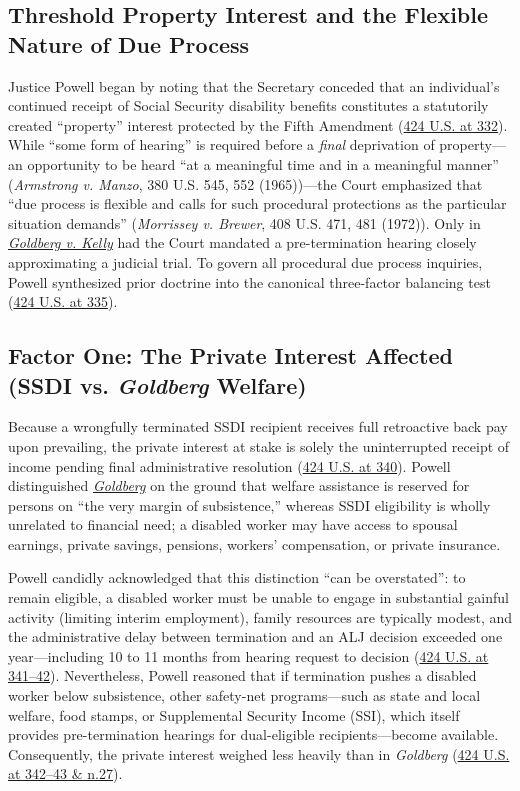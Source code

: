 \documentclass[12pt]{article}
\begin{document}
\subsection{Threshold Property Interest and the Flexible Nature of Due Process}
Justice Powell began by noting that the Secretary conceded that an individual's continued receipt of Social Security disability benefits constitutes a statutorily created ``property'' interest protected by the Fifth Amendment (\href{https://supreme.justia.com/cases/federal/us/424/319/}{424 U.S. at 332}). While ``some form of hearing'' is required before a \emph{final} deprivation of property---an opportunity to be heard ``at a meaningful time and in a meaningful manner'' (\emph{Armstrong v. Manzo}, 380 U.S. 545, 552 (1965))---the Court emphasized that ``due process is flexible and calls for such procedural protections as the particular situation demands'' (\emph{Morrissey v. Brewer}, 408 U.S. 471, 481 (1972)). Only in \href{https://supreme.justia.com/cases/federal/us/397/254/}{\emph{Goldberg v. Kelly}} had the Court mandated a pre-termination hearing closely approximating a judicial trial. To govern all procedural due process inquiries, Powell synthesized prior doctrine into the canonical three-factor balancing test (\href{https://supreme.justia.com/cases/federal/us/424/319/}{424 U.S. at 335}).

\subsection{Factor One: The Private Interest Affected (SSDI vs. \emph{Goldberg} Welfare)}
Because a wrongfully terminated SSDI recipient receives full retroactive back pay upon prevailing, the private interest at stake is solely the uninterrupted receipt of income pending final administrative resolution (\href{https://supreme.justia.com/cases/federal/us/424/319/}{424 U.S. at 340}). Powell distinguished \href{https://supreme.justia.com/cases/federal/us/397/254/}{\emph{Goldberg}} on the ground that welfare assistance is reserved for persons on ``the very margin of subsistence,'' whereas SSDI eligibility is wholly unrelated to financial need; a disabled worker may have access to spousal earnings, private savings, pensions, workers' compensation, or private insurance.

Powell candidly acknowledged that this distinction ``can be overstated'': to remain eligible, a disabled worker must be unable to engage in substantial gainful activity (limiting interim employment), family resources are typically modest, and the administrative delay between termination and an ALJ decision exceeded one year---including 10 to 11 months from hearing request to decision (\href{https://supreme.justia.com/cases/federal/us/424/319/}{424 U.S. at 341--42}). Nevertheless, Powell reasoned that if termination pushes a disabled worker below subsistence, other safety-net programs---such as state and local welfare, food stamps, or Supplemental Security Income (SSI), which itself provides pre-termination hearings for dual-eligible recipients---become available. Consequently, the private interest weighed less heavily than in \emph{Goldberg} (\href{https://supreme.justia.com/cases/federal/us/424/319/}{424 U.S. at 342--43 \& n.27}).
\end{document}
